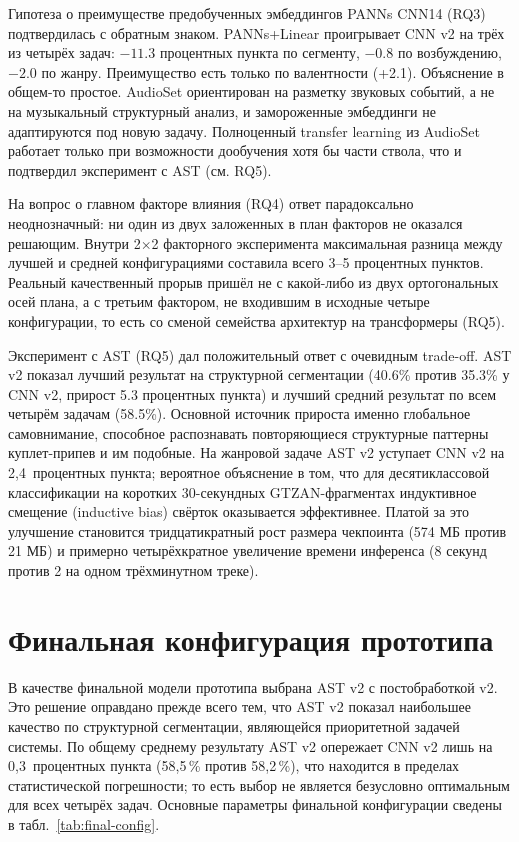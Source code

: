 Гипотеза о преимуществе предобученных эмбеддингов PANNs CNN14 (RQ3) подтвердилась с обратным знаком. PANNs+Linear проигрывает CNN v2 на трёх из четырёх задач: $-11.3$ процентных пункта по сегменту, $-0.8$ по возбуждению, $-2.0$ по жанру. Преимущество есть только по валентности (+2.1). Объяснение в общем-то простое. AudioSet ориентирован на разметку звуковых событий, а не на музыкальный структурный анализ, и замороженные эмбеддинги не адаптируются под новую задачу. Полноценный transfer learning из AudioSet работает только при возможности дообучения хотя бы части ствола, что и подтвердил эксперимент с AST (см. RQ5).

На вопрос о главном факторе влияния (RQ4) ответ парадоксально неоднозначный: ни один из двух заложенных в план факторов не оказался решающим. Внутри 2$\times$2 факторного эксперимента максимальная разница между лучшей и средней конфигурациями составила всего 3--5 процентных пунктов. Реальный качественный прорыв пришёл не с какой-либо из двух ортогональных осей плана, а с третьим фактором, не входившим в исходные четыре конфигурации, то есть со сменой семейства архитектур на трансформеры (RQ5).

Эксперимент с AST (RQ5) дал положительный ответ с очевидным trade-off. AST v2 показал лучший результат на структурной сегментации (40.6\% против 35.3\% у CNN v2, прирост 5.3 процентных пункта) и лучший средний результат по всем четырём задачам (58.5\%). Основной источник прироста именно глобальное самовнимание, способное распознавать повторяющиеся структурные паттерны куплет-припев и им подобные. На жанровой задаче AST v2 уступает CNN v2 на 2{,}4~процентных пункта; вероятное объяснение в том, что для десятиклассовой классификации на коротких 30-секундных GTZAN-фрагментах индуктивное смещение (inductive bias) свёрток оказывается эффективнее. Платой за это улучшение становится тридцатикратный рост размера чекпоинта (574 МБ против 21 МБ) и примерно четырёхкратное увеличение времени инференса (8 секунд против 2 на одном трёхминутном треке).

\section{Финальная конфигурация прототипа}\label{sec:7-2}

В качестве финальной модели прототипа выбрана AST v2 с постобработкой v2. Это решение оправдано прежде всего тем, что AST v2 показал наибольшее качество по структурной сегментации, являющейся приоритетной задачей системы. По общему среднему результату AST v2 опережает CNN v2 лишь на 0{,}3~процентных пункта (58{,}5\,\% против 58{,}2\,\%), что находится в пределах статистической погрешности; то есть выбор не является безусловно оптимальным для всех четырёх задач. Основные параметры финальной конфигурации сведены в табл.~\ref{tab:final-config}.


